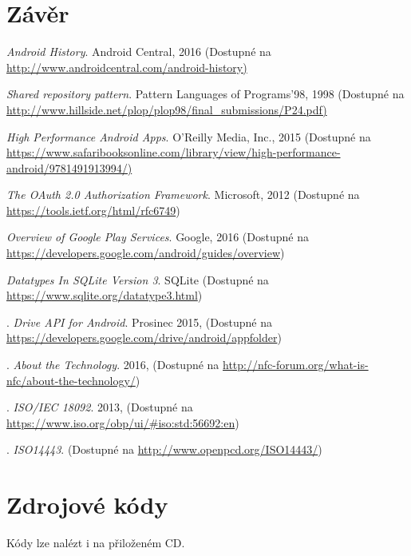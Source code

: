 \documentclass{article}
\begin{document}
\section{Závěr}


\begin{thebibliography}{99}


\textit{Android History}. {Android Central, 2016}
\newline(Dostupné na \url{http://www.androidcentral.com/android-history)}

\textit{Shared repository pattern}. {Pattern Languages of Programs'98, 1998}
\newline(Dostupné na \url{http://www.hillside.net/plop/plop98/final_submissions/P24.pdf)}

\textit{High Performance Android Apps}. {O'Reilly Media, Inc., 2015}
\newline(Dostupné na \url{https://www.safaribooksonline.com/library/view/high-performance-android/9781491913994/)}

\textit{The OAuth 2.0 Authorization Framework}. {Microsoft, 2012
\newline(Dostupné na \url{https://tools.ietf.org/html/rfc6749})}

\textit{Overview of Google Play Services}. {Google, 2016
\newline(Dostupné na \url{https://developers.google.com/android/guides/overview})}

\textit{Datatypes In SQLite Version 3}. {SQLite
\newline(Dostupné na \url{https://www.sqlite.org/datatype3.html})}



.
\textit{Drive API for Android}. {Prosinec 2015,
\newline(Dostupné na \url{https://developers.google.com/drive/android/appfolder})}

.
\textit{About the Technology}. {2016,
\newline(Dostupné na \url{http://nfc-forum.org/what-is-nfc/about-the-technology/})}

.
\textit{ISO/IEC 18092}. {2013,
\newline(Dostupné na \url{https://www.iso.org/obp/ui/#iso:std:56692:en})}


.
\textit{ISO14443}. {
\newline(Dostupné na \url{http://www.openpcd.org/ISO14443/})}

\end{thebibliography}

  \appendix

  \section{Zdrojové kódy}
  Kódy lze nalézt i na přiloženém CD.
\end{document}
